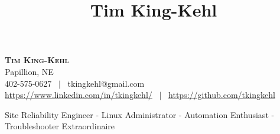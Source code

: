 \documentclass[10pt, a4paper]{article}
\title{\textbf{Tim King-Kehl}}
\date{}
\begin{document}
\begin{center}
    \textbf{\Huge \scshape Tim King-Kehl} \\ \vspace{1pt}
    Papillion, NE \\ \vspace{1pt}
     402-575-0627 \ $|$ \ tkingkehl@gmail.com \\ \vspace{1pt} 
     \url{https://www.linkedin.com/in/tkingkehl/} \ $|$ \ \url{https://github.com/tkingkehl} \\ \vspace{1pt} 
\end{center}
Site Reliability Engineer - Linux Administrator - Automation Enthusiast - Troubleshooter Extraordinaire \newline
\end{document}
